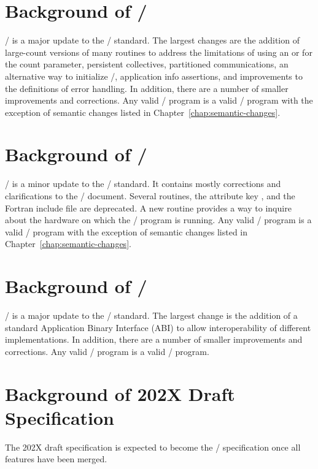 \section{Background of \texorpdfstring{\MPIIVDOTO/}{MPI-4.0}}
\MPIIVDOTO/ is a major update to the \MPI/ standard.
The largest changes are the addition of large-count versions of many
routines to address the limitations of using an 
or  for the count parameter, persistent collectives, partitioned
communications, an alternative way to initialize \MPI/, application
info assertions, and improvements to the definitions of error handling.
In addition, there are a number of smaller improvements and corrections.
Any
valid \MPIIIIDOTI/ program is a valid \MPIIVDOTO/ program with the exception of
semantic changes listed in Chapter~\ref{chap:semantic-changes}.

\section{Background of \texorpdfstring{\MPIIVDOTI/}{MPI-4.1}}
\MPIIVDOTI/ is a minor update to the \MPI/ standard.
It contains mostly corrections
and clarifications to the \MPIIVDOTO/ document.
Several routines, the
attribute key , and the  Fortran
include file are deprecated.
A new routine provides a way to inquire about the hardware on which
the \MPI/ program is running.
Any valid \MPIIVDOTO/ program is a valid \MPIIVDOTI/ program with the
exception of semantic changes listed in
Chapter~\ref{chap:semantic-changes}.

\section{Background of \texorpdfstring{\MPIVDOTO/}{MPI-5.0}}
\MPIVDOTO/ is a major update to the \MPI/ standard.
The largest change is the addition of a standard Application
Binary Interface (ABI) to allow interoperability of different
implementations.
In addition, there are a number of smaller improvements and corrections.
Any valid \MPIIVDOTI/ program is a valid \MPIVDOTO/ program.

\ifdraftspec
\section{Background of 202X Draft Specification}
The 202X draft specification is expected to become the \MPIVDOTI/
specification once all features have been merged.
\else
\fi


